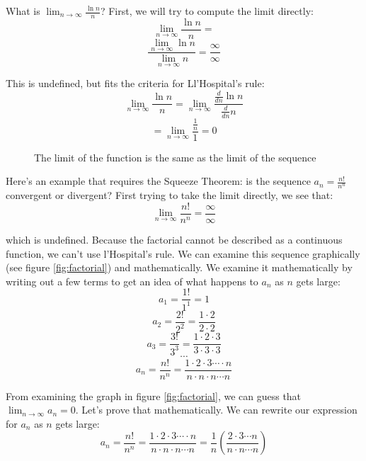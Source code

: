 What is $\lim_{n \to \infty} \frac{\ln{n}}{n}$? First, we will try to 
compute the limit directly:
$$\lim_{n \to \infty} \frac{\ln{n}}{n} = $$
$$\frac{\lim_{n \to \infty} \ln{n}}{\lim_{n \to \infty}n} = 
\frac{\infty}{\infty}$$

This is undefined, but fits the criteria for Ll'Hospital's rule:
$$\lim_{n \to \infty} \frac{\ln{n}}{n} = \lim_{n \to \infty} 
\frac{\frac{d}{dn}\ln{n}}{\frac{d}{dn}n}$$
$$= \lim_{n \to \infty} \frac{\frac{1}{n}}{1} = 0$$

\begin{figure}[htbp]
\centering
    \caption{The limit of the function is the same as the limit of the sequence}
    \label{fig:limit}
\end{figure}

Here's an example that requires the Squeeze Theorem: is the sequence 
$a_n = \frac{n!}{n^n}$ convergent or divergent? First trying to take 
the limit directly, we see that:
$$\lim_{n \to \infty} \frac{n!}{n^n} = \frac{\infty}{\infty}$$

which is undefined. Because the factorial cannot be described as a 
continuous function, we can't use l'Hospital's rule. We can examine 
this sequence graphically (see figure \ref{fig:factorial}) and 
mathematically. We examine it mathematically by writing out a few 
terms to get an idea of what happens to $a_n$ as $n$ gets large:
$$a_1 = \frac{1!}{1^1} = 1$$
$$a_2 = \frac{2!}{2^2} = \frac{1 \cdot 2}{2 \cdot 2}$$
$$a_3 = \frac{3!}{3^3} = \frac{1 \cdot 2 \cdot 3}{3 \cdot 3 \cdot 3}$$
$$\cdots$$
$$a_n = \frac{n!}{n^n} = \frac{1 \cdot 2 \cdot 3 \cdots \cdot n}{n 
\cdot n \cdot n \cdots n}$$

From examining the graph in figure \ref{fig:factorial}, we can guess 
that $\lim_{n \to \infty} a_n = 0$. Let's prove that mathematically. 
We can rewrite our expression for $a_n$ as $n$ gets large:
$$a_n = \frac{n!}{n^n} = \frac{1 \cdot 2 \cdot 3 \cdots \cdot n}{n 
\cdot n \cdot n \cdots n} = \frac{1}{n}(\frac{2 \cdot 3 \cdots n}{n 
\cdot n \cdots n})$$

